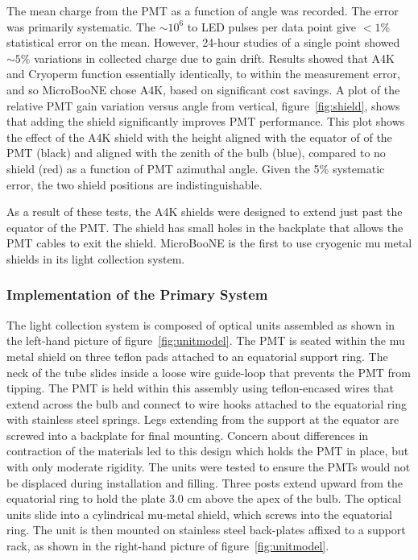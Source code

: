 The mean charge from the PMT as a function of angle was recorded.  The error was primarily systematic.   The $\sim10^6$ to LED pulses per data point give $<1\%$ statistical error on the mean.  However, 24-hour studies of a single point showed $\sim5\%$ variations in collected charge due to gain drift.  Results showed that A4K and Cryoperm function essentially identically, to within the measurement error, and so MicroBooNE chose A4K, based on significant cost savings.    A plot of the relative PMT gain variation versus angle from vertical, figure~\ref{fig:shield}, shows that adding the shield significantly improves PMT performance.  This plot shows the effect of the A4K shield with the height aligned with the equator of of the PMT (black) and aligned with the zenith of the bulb (blue), compared to no shield (red) as a function of PMT azimuthal angle.  Given the 5\% systematic error, the two shield positions are indistinguishable.  

As a result of these tests, the A4K shields were designed to extend just past the equator of the PMT.  The shield has small holes in the backplate that allows the PMT cables to exit the shield.   MicroBooNE is the first \lartpc to use cryogenic mu metal shields in its light collection system.  


\subsubsection{Implementation of the Primary System \label{LCUnitimplement}}


The light collection system is composed of optical units assembled as shown in the left-hand picture of figure~\ref{fig:unitmodel}.  The PMT is seated within the mu metal shield on three teflon pads attached to an equatorial support ring.  The neck of the tube slides inside a loose wire guide-loop that prevents the PMT from tipping.  The PMT is held within this assembly using teflon-encased wires that extend across the bulb and connect to wire hooks attached to the equatorial ring with stainless steel springs. Legs extending from the support at the equator are screwed into a backplate for final mounting.  Concern about differences in contraction of the materials led to this design which holds the PMT in place, but with only moderate rigidity.  The units were tested to ensure the PMTs would not be displaced during installation and filling.  Three posts extend upward from the equatorial ring to hold the plate 3.0 cm above the apex of the bulb.   The optical units slide into a cylindrical mu-metal shield, which screws into the equatorial ring.  The unit is then mounted on stainless steel back-plates affixed to a support rack, as shown in the right-hand picture of figure~\ref{fig:unitmodel}.

